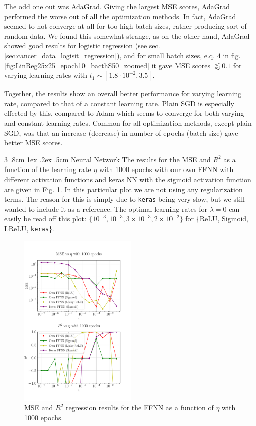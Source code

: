 \documentclass[%
reprint,s
amsmath,amssymb,
aps,
]{revtex4-2}
\makeatletter
\renewcommand{\subsubsection}{%
	\@startsection
	{subsubsection}%
	{3}%
	{\z@}%
	{.8cm \@plus1ex \@minus .2ex}%
	{.5cm}%
	{\normalfont\small\centering}%
}
\makeatother
\begin{document}
The odd one out was AdaGrad. Giving the largest MSE scores, AdaGrad performed the worse out of all the optimization methods. In fact, AdaGrad seemed to not converge at all for too high batch sizes, rather producing sort of random data. We found this somewhat strange, as on the other hand, AdaGrad showed good results for logistic regression (see sec. \ref{sec:cancer_data_logisit_regression}), and for small batch sizes, e.q. \(4\) in fig. \ref{fig:LinReg25x25_epoch10_bacthS50_zoomed} it gave MSE scores \(\lessapprox 0.1\) for varying learning rates with \(t_1\sim[1.8\cdot 10^{-2}, 3.5]\).

Together, the results show an overall better performance for varying learning rate, compared to that of a constant learning rate. Plain SGD is especially effected by this, compared to Adam which seems to converge for both varying and constant learning rates. Common for all optimization methods, except plain SGD, was that an increase (decrease) in number of epochs (batch size) gave better MSE scores.

\subsubsection{Neural Network}
The results for the MSE and $R^2$ as a function of the learning rate $\eta$ with 1000 epochs with our own FFNN with different activation functions and keras NN with the sigmoid activation function are given in Fig. \ref{fig:NN_Franke_LR_1000}. In this particular plot we are not using any regularization terms. The reason for this is simply due to \texttt{keras} being very slow, but we still wanted to include it as a reference. The optimal learning rates for $\lambda=0$ can easily be read off this plot: $\{10^{-3},10^{-3},3\times10^{-3},2\times 10^{-2}\}$ for \{ReLU, Sigmoid, LReLU, \texttt{keras}\}.
\begin{figure}[ht!]
	\includegraphics[width=0.5\textwidth]{Figures/NN_MSE_R2_Franke_LearningRate_Epochs1000.pdf}
	\caption{MSE and $R^2$ regression results for the FFNN as a function of $\eta$ with 1000 epochs.}
	\label{fig:NN_Franke_LR_1000}
\end{figure}
\end{document}
